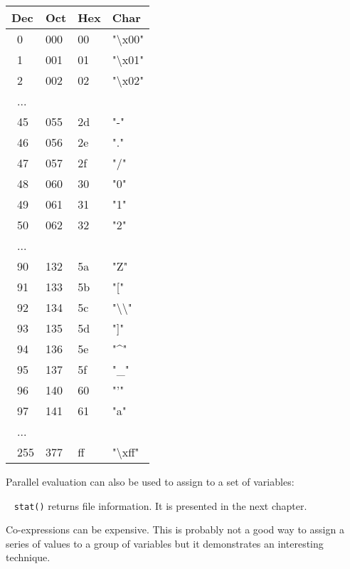 \begin{center}
\begin{xtabular}{m{2.00cm}m{2.00cm}m{2.00cm}m{2.00cm}}\\
{\sffamily\bfseries Dec} &
{\sffamily\bfseries Oct} &
{\sffamily\bfseries Hex} &
{\sffamily\bfseries Char}\\\hline
\ 0  &  000  &  00  &  "{\textbackslash}x00"\\
\ 1  &  001  &  01  &  "{\textbackslash}x01"\\
\ 2  &  002  &  02  &  "{\textbackslash}x02"\\
\ ...\\
\ 45  &  055  &  2d  &  "-"\\
\ 46  &  056  &  2e  &  "."\\
\ 47  &  057  &  2f  &  "/"\\
\ 48  &  060  &  30  &  "0"\\
\ 49  &  061  &  31  &  "1"\\
\ 50  &  062  &  32  &  "2"\\
\ ...\\
\ 90  &  132  &  5a  &  "Z"\\
\ 91  &  133  &  5b  &  "["\\
\ 92  &  134  &  5c  &  "{\textbackslash}{\textbackslash}"\\
\ 93  &  135  &  5d  &  "]"\\
\ 94  &  136  &  5e  &  "\^{}"\\
\ 95  &  137  &  5f  &  "\_"\\
\ 96  &  140  &  60  &  "'"\\
\ 97  &  141  &  61  &  "a"\\
\ ...\\
\ 255  &  377  &  ff  &  "{\textbackslash}xff"\\
\end{xtabular}
\end{center}

\noindent
Parallel evaluation can also be used to assign to a set of variables:


\medskip{}\ {\sffamily
\texttt{stat()} returns file information. It is presented in the next chapter.}\medskip

\noindent
Co-expressions can be expensive. This is probably not a
good way to assign a series of values to a group of variables but it
demonstrates an interesting technique.

